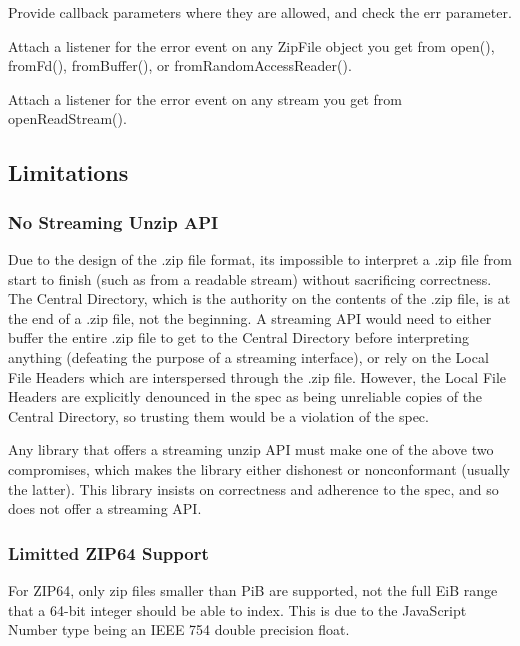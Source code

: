 \begin{DoxyItemize}
\item Provide {\ttfamily callback} parameters where they are allowed, and check the {\ttfamily err} parameter.
\item Attach a listener for the {\ttfamily error} event on any {\ttfamily Zip\+File} object you get from {\ttfamily open()}, {\ttfamily from\+Fd()}, {\ttfamily from\+Buffer()}, or {\ttfamily from\+Random\+Access\+Reader()}.
\item Attach a listener for the {\ttfamily error} event on any stream you get from {\ttfamily open\+Read\+Stream()}.
\end{DoxyItemize}

\subsection*{Limitations}

\subsubsection*{No Streaming Unzip A\+PI}

Due to the design of the .zip file format, it\textquotesingle{}s impossible to interpret a .zip file from start to finish (such as from a readable stream) without sacrificing correctness. The Central Directory, which is the authority on the contents of the .zip file, is at the end of a .zip file, not the beginning. A streaming A\+PI would need to either buffer the entire .zip file to get to the Central Directory before interpreting anything (defeating the purpose of a streaming interface), or rely on the Local File Headers which are interspersed through the .zip file. However, the Local File Headers are explicitly denounced in the spec as being unreliable copies of the Central Directory, so trusting them would be a violation of the spec.

Any library that offers a streaming unzip A\+PI must make one of the above two compromises, which makes the library either dishonest or nonconformant (usually the latter). This library insists on correctness and adherence to the spec, and so does not offer a streaming A\+PI.

\subsubsection*{Limitted Z\+I\+P64 Support}

For Z\+I\+P64, only zip files smaller than {\+PiB} are supported, not the full {\+EiB} range that a 64-\/bit integer should be able to index. This is due to the Java\+Script Number type being an I\+E\+EE 754 double precision float.

